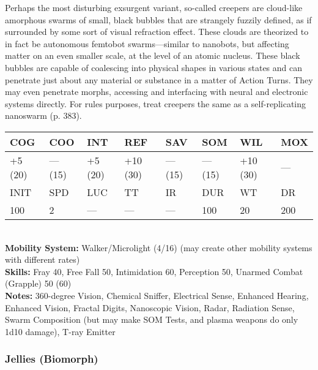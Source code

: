 Perhaps the most disturbing exsurgent variant, so-called
creepers are cloud-like amorphous swarms of
small, black bubbles that are strangely fuzzily defined, 
as if surrounded by some sort of visual refraction effect. 
These clouds are theorized to in fact be autonomous 
femtobot swarms—similar to nanobots, but affecting 
matter on an even smaller scale, at the level of an atomic 
nucleus. These black bubbles are capable of coalescing 
into physical shapes in various states and can penetrate 
just about any material or substance in a matter of 
Action Turns. They may even penetrate morphs, accessing
and interfacing with neural and electronic systems
directly. For rules purposes, treat creepers the same as a 
self-replicating nanoswarm (p. 383).\\
\begin{tabular}{|l|l|l|l|l|l|l|l|}
\hline
COG & COO & INT & REF & SAV & SOM & WIL & MOX \\
\hline
+5 (20) &  — (15) &  +5 (20) &  +10 (30) &  — (15) &  — (15) &  +10 (30) &  — \\
\hline
INIT & SPD & LUC & TT & IR & DUR & WT & DR \\
\hline
100 & 2 & — & — & — & 100 & 20 & 200 \\
\hline
\end{tabular}
\\
\textbf{Mobility System: }Walker/Microlight (4/16) (may create other mobility systems with different rates) \\
\textbf{Skills:} Fray 40, Free Fall 50, Intimidation 60, Perception 50, Unarmed Combat (Grapple) 50 (60) \\
\textbf{Notes: }360-degree Vision, Chemical Sniffer, Electrical Sense, Enhanced Hearing, Enhanced Vision, Fractal Digits, Nanoscopic Vision, Radar, Radiation Sense, Swarm Composition (but may make SOM Tests, and plasma weapons do only 1d10 damage), T-ray Emitter



\subsubsection{Jellies (Biomorph)}

